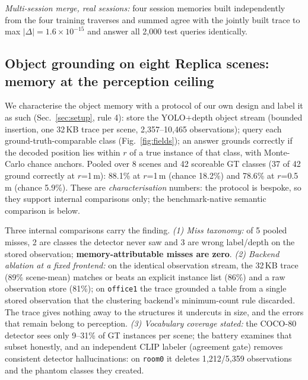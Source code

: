 \documentclass[conference]{IEEEtran}
\begin{document}
\emph{Multi-session merge, real sessions:} four session memories built
independently from the four training traverses and summed agree with the
jointly built trace to max $|\Delta| = 1.6\times10^{-15}$ and answer all
2{,}000 test queries identically.

\subsection{Object grounding on eight Replica scenes: memory at the
perception ceiling}
\label{sec:grounding}

We characterise the object memory with a protocol of our own design and
label it as such (Sec.~\ref{sec:setup}, rule 4): store the YOLO+depth
object stream (bounded insertion, one 32\,KB trace per scene,
2{,}357--10{,}465 observations); query each ground-truth-comparable
class (Fig.~\ref{fig:fields}); an answer grounds correctly if the decoded
position lies within $r$ of a true instance of that class, with
Monte-Carlo chance anchors.
Pooled over 8 scenes and 42 scoreable GT classes (37 of 42 ground
correctly at $r$=1\,m): 88.1\% at $r$=1\,m (chance 18.2\%) and 78.6\%
at $r$=0.5\,m (chance 5.9\%).
These are \emph{characterisation} numbers: the protocol is bespoke, so
they support internal comparisons only; the benchmark-native semantic
comparison is below.

Three internal comparisons carry the finding. \emph{(1) Miss taxonomy:}
of 5 pooled misses, 2 are classes the detector never saw and 3 are wrong
label/depth on the stored observation; \textbf{memory-attributable
misses are zero}. \emph{(2) Backend ablation at a fixed frontend:} on the
identical observation stream, the 32\,KB trace (89\% scene-mean) matches
or beats an explicit instance list (86\%) and a raw observation store
(81\%); on \texttt{office1} the trace grounded a table from a single
stored observation that the clustering backend's minimum-count rule
discarded. The trace gives nothing away to the structures it undercuts in
size, and the errors that remain belong to perception. \emph{(3)
Vocabulary coverage stated:} the COCO-80 detector sees only 9--31\% of GT
instances per scene; the battery examines that subset honestly, and an
independent CLIP labeler (agreement gate) removes consistent detector
hallucinations: on \texttt{room0} it deletes 1{,}212/5{,}359
observations and the phantom classes they created.
\end{document}
